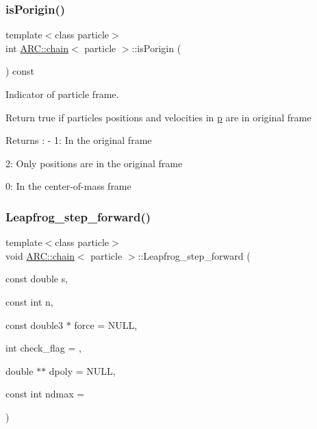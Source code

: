 \subsubsection{\texorpdfstring{is\+Porigin()}{isPorigin()}}
{\footnotesize\ttfamily template$<$class particle$>$ \\
int \hyperlink{classARC_1_1chain}{A\+R\+C\+::chain}$<$ particle $>$\+::is\+Porigin (\begin{DoxyParamCaption}{ }\end{DoxyParamCaption}) const\hspace{0.3cm}{\ttfamily [inline]}}



Indicator of particle frame. 

Return true if particles positions and velocities in \hyperlink{classARC_1_1chain_af1793b656e139e1f87c2e0a55f87514b}{p} are in original frame \begin{DoxyReturn}{Returns}
\+: -\/ 1\+: In the original frame
\begin{DoxyItemize}
\item 2\+: Only positions are in the original frame
\item 0\+: In the center-\/of-\/mass frame 
\end{DoxyItemize}
\end{DoxyReturn}
\hypertarget{classARC_1_1chain_a82b26731761231d86fd2e0b4529df6fa}{}\label{classARC_1_1chain_a82b26731761231d86fd2e0b4529df6fa} 
\subsubsection{\texorpdfstring{Leapfrog\+\_\+step\+\_\+forward()}{Leapfrog\_step\_forward()}}
{\footnotesize\ttfamily template$<$class particle$>$ \\
void \hyperlink{classARC_1_1chain}{A\+R\+C\+::chain}$<$ particle $>$\+::Leapfrog\+\_\+step\+\_\+forward (\begin{DoxyParamCaption}\item[{const double}]{s,  }\item[{const int}]{n,  }\item[{const double3 $\ast$}]{force = {\ttfamily NULL},  }\item[{int}]{check\+\_\+flag = {},  }\item[{double $\ast$$\ast$}]{dpoly = {\ttfamily NULL},  }\item[{const int}]{ndmax = {} }\end{DoxyParamCaption})\hspace{0.3cm}{\ttfamily [inline]}}



